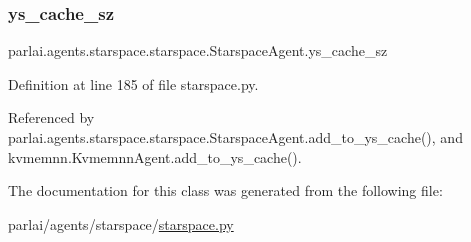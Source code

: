 \subsubsection{\texorpdfstring{ys\+\_\+cache\+\_\+sz}{ys\_cache\_sz}}
{\footnotesize\ttfamily parlai.\+agents.\+starspace.\+starspace.\+Starspace\+Agent.\+ys\+\_\+cache\+\_\+sz}



Definition at line 185 of file starspace.\+py.



Referenced by parlai.\+agents.\+starspace.\+starspace.\+Starspace\+Agent.\+add\+\_\+to\+\_\+ys\+\_\+cache(), and kvmemnn.\+Kvmemnn\+Agent.\+add\+\_\+to\+\_\+ys\+\_\+cache().



The documentation for this class was generated from the following file\+:\begin{DoxyCompactItemize}
\item 
parlai/agents/starspace/\hyperlink{starspace_8py}{starspace.\+py}\end{DoxyCompactItemize}

